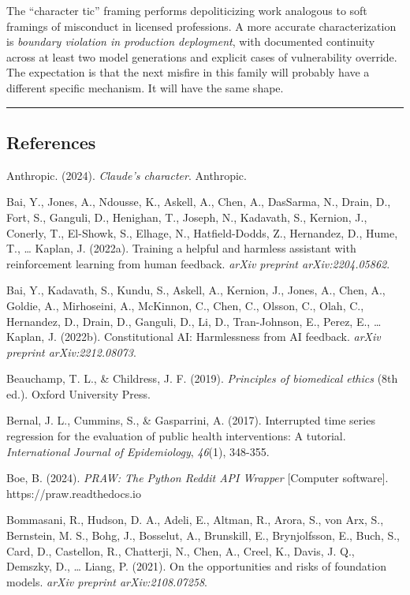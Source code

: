 \documentclass[11pt]{article}
\begin{document}
The ``character tic'' framing performs depoliticizing work analogous to soft framings of misconduct in licensed professions. A more accurate characterization is \emph{boundary violation in production deployment}, with documented continuity across at least two model generations and explicit cases of vulnerability override. The expectation is that the next misfire in this family will probably have a different specific mechanism. It will have the same shape.

\bigskip\hrule\bigskip

\subsection{References}

Anthropic. (2024). \emph{Claude's character}. Anthropic.

Bai, Y., Jones, A., Ndousse, K., Askell, A., Chen, A., DasSarma, N., Drain, D., Fort, S., Ganguli, D., Henighan, T., Joseph, N., Kadavath, S., Kernion, J., Conerly, T., El-Showk, S., Elhage, N., Hatfield-Dodds, Z., Hernandez, D., Hume, T., \ldots{} Kaplan, J. (2022a). Training a helpful and harmless assistant with reinforcement learning from human feedback. \emph{arXiv preprint arXiv:2204.05862}.

Bai, Y., Kadavath, S., Kundu, S., Askell, A., Kernion, J., Jones, A., Chen, A., Goldie, A., Mirhoseini, A., McKinnon, C., Chen, C., Olsson, C., Olah, C., Hernandez, D., Drain, D., Ganguli, D., Li, D., Tran-Johnson, E., Perez, E., \ldots{} Kaplan, J. (2022b). Constitutional AI: Harmlessness from AI feedback. \emph{arXiv preprint arXiv:2212.08073}.

Beauchamp, T. L., \& Childress, J. F. (2019). \emph{Principles of biomedical ethics} (8th ed.). Oxford University Press.

Bernal, J. L., Cummins, S., \& Gasparrini, A. (2017). Interrupted time series regression for the evaluation of public health interventions: A tutorial. \emph{International Journal of Epidemiology}, \emph{46}(1), 348-355.

Boe, B. (2024). \emph{PRAW: The Python Reddit API Wrapper} [Computer software]. https://praw.readthedocs.io

Bommasani, R., Hudson, D. A., Adeli, E., Altman, R., Arora, S., von Arx, S., Bernstein, M. S., Bohg, J., Bosselut, A., Brunskill, E., Brynjolfsson, E., Buch, S., Card, D., Castellon, R., Chatterji, N., Chen, A., Creel, K., Davis, J. Q., Demszky, D., \ldots{} Liang, P. (2021). On the opportunities and risks of foundation models. \emph{arXiv preprint arXiv:2108.07258}.
\end{document}
